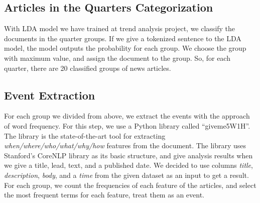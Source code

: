 \subsection{Articles in the Quarters Categorization}

With LDA model we have trained at trend analysis project,
we classify the documents in the quarter groups.
If we give a tokenized sentence to the LDA model,
the model outputs the probability for each group.
We choose the group with maximum value, and assign the document to the group.
So, for each quarter, there are 20 classified groups of news articles.

\subsection{Event Extraction}

For each group we divided from above,
we extract the events with the approach of word frequency.
For this step, we use a Python library called ``giveme5W1H''.
The library is the state-of-the-art tool for extracting
\textit{when/where/who/what/why/how} features from the document.
The library uses Stanford's CoreNLP library as its basic structure,
and give analysis results when we give a
title, lead, text, and a published date.
We decided to use columns \textit{title}, \textit{description}, \textit{body}, and a \textit{time}
from the given dataset as an input to get a result.
For each group, we count the frequencies of each feature of the articles,
and select the most frequent terms for each feature, treat them as an event.

